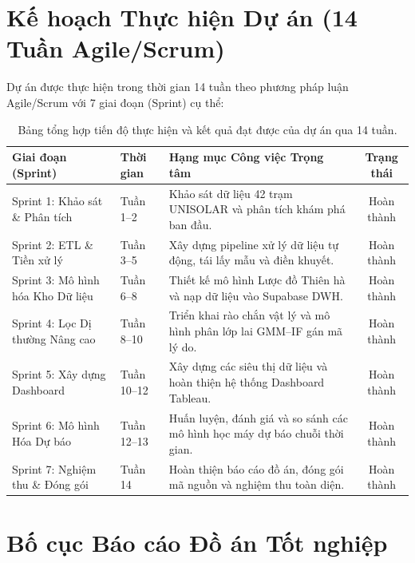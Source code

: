 \documentclass[12pt, a4paper]{report}
\begin{document}
\section{Kế hoạch Thực hiện Dự án (14 Tuần Agile/Scrum)}
\label{sec:kehoach}

Dự án được thực hiện trong thời gian 14 tuần theo phương pháp luận Agile/Scrum với 7 giai đoạn (Sprint) cụ thể:

\begin{table}[H]
\centering
\small
\renewcommand{\arraystretch}{1.25}
\begin{tabularx}{\textwidth}{@{} l l X c @{}}
\toprule
\textbf{Giai đoạn (Sprint)} & \textbf{Thời gian} & \textbf{Hạng mục Công việc Trọng tâm} & \textbf{Trạng thái} \\
\midrule
Sprint 1: Khảo sát \& Phân tích & Tuần 1--2 & Khảo sát dữ liệu 42 trạm UNISOLAR và phân tích khám phá ban đầu. & Hoàn thành \\
Sprint 2: ETL \& Tiền xử lý & Tuần 3--5 & Xây dựng pipeline xử lý dữ liệu tự động, tái lấy mẫu và điền khuyết. & Hoàn thành \\
Sprint 3: Mô hình hóa Kho Dữ liệu & Tuần 6--8 & Thiết kế mô hình Lược đồ Thiên hà và nạp dữ liệu vào Supabase DWH. & Hoàn thành \\
Sprint 4: Lọc Dị thường Nâng cao & Tuần 8--10 & Triển khai rào chắn vật lý và mô hình phân lớp lai GMM--IF gán mã lý do. & Hoàn thành \\
Sprint 5: Xây dựng Dashboard & Tuần 10--12 & Xây dựng các siêu thị dữ liệu và hoàn thiện hệ thống Dashboard Tableau. & Hoàn thành \\
Sprint 6: Mô hình Hóa Dự báo & Tuần 12--13 & Huấn luyện, đánh giá và so sánh các mô hình học máy dự báo chuỗi thời gian. & Hoàn thành \\
Sprint 7: Nghiệm thu \& Đóng gói & Tuần 14 & Hoàn thiện báo cáo đồ án, đóng gói mã nguồn và nghiệm thu toàn diện. & Hoàn thành \\
\bottomrule
\end{tabularx}
\caption{Bảng tổng hợp tiến độ thực hiện và kết quả đạt được của dự án qua 14 tuần.}
\label{tab:project_timeline}
\end{table}

\section{Bố cục Báo cáo Đồ án Tốt nghiệp}
\label{sec:bocuc}
\end{document}
